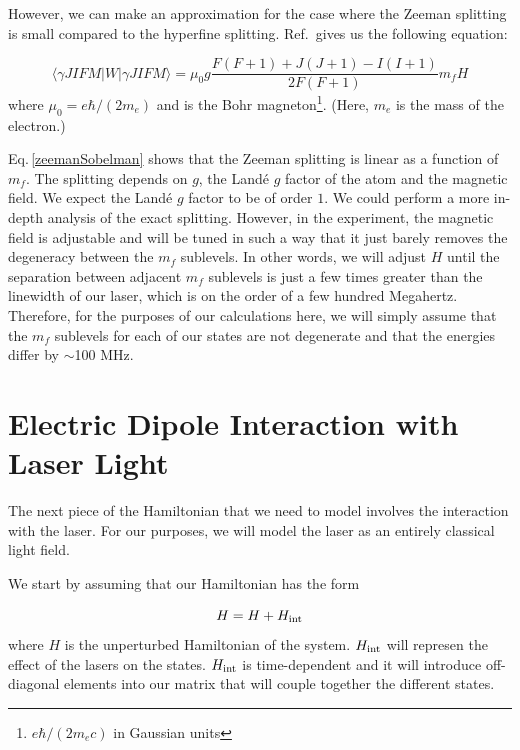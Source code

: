 However, we can make an approximation for the case where the Zeeman splitting is small compared to the hyperfine splitting. 
Ref.\,\cite{sobelman_spectra} gives us the following equation:

\begin{equation} \label{zeemanSobelman}
\langle{\gamma JIFM|W|\gamma JIFM\rangle = \mu_0 g \frac{F(F+1)+J(J+1)-I(I+1)}{2F(F+1)}m_f H}
\end{equation}
where $\mu_0=e\hbar/(2 m_e)$ and is the Bohr magneton\footnote{$e \hbar / (2 m_e c)$ in Gaussian units}. (Here, $m_e$ is the mass of the electron.)

Eq.\,\ref{zeemanSobelman} shows that the Zeeman splitting is linear as a function of $m_f$. The splitting depends on $g$, the Land\'e $g$ factor of the atom and the magnetic field. We expect the Land\'e $g$ factor to be of order $1$. We could perform a more in-depth analysis of the exact splitting. However, in the experiment, the magnetic field is adjustable and will be tuned in such a way that it just barely removes the degeneracy between the $m_f$ sublevels. In other words, we will adjust $H$ until the separation between adjacent $m_f$ sublevels is just a few times greater than the linewidth of our laser, which is on the order of a few hundred Megahertz. Therefore, for the purposes of our calculations here, we will simply assume that the $m_f$ sublevels for each of our states are not degenerate and that the energies differ by $\sim$100 MHz.

\section{Electric Dipole Interaction with Laser Light}
\label{ElectricDipoleInteraction}

The next piece of the Hamiltonian that we need to model involves the interaction with the laser. For our purposes, we will model the laser as an entirely classical light field.  

We start by assuming that our Hamiltonian has the form 

\begin{equation}
H=H+H_{\textnormal{int}}
\end{equation}
where $H$ is the unperturbed Hamiltonian of the system. $H_{\textnormal{int}}$ will represen the effect of the lasers on the states. $H_\textnormal{int}$ is time-dependent and it will introduce off-diagonal elements into our matrix that will couple together the different states. 

